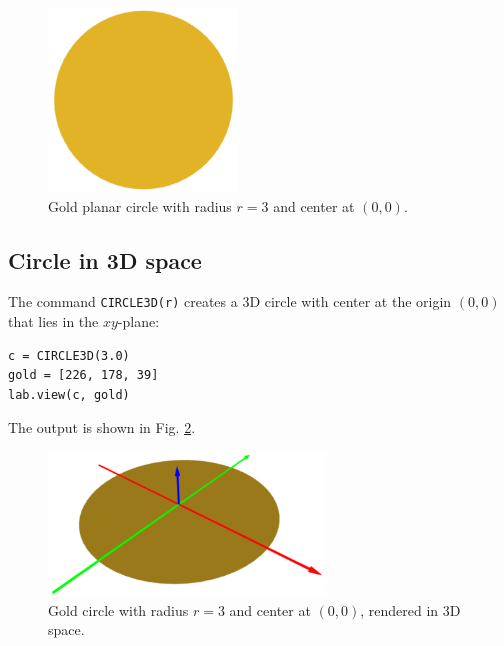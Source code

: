 \begin{figure}[!ht]
\begin{center}
\includegraphics[width=0.45\textwidth]{img/circle-1.png}
\end{center}
\vspace{-4mm}
\caption{Gold planar circle with radius $r = 3$ and center at $(0, 0)$.}
\label{fig:circle-1}
\end{figure}
\noindent

\subsection{Circle in 3D space}

The command {\tt CIRCLE3D(r)}
creates a 3D circle with center at the origin $(0, 0)$ that lies 
in the $xy$-plane:\\

\begin{bbox}
\begin{verbatim}
c = CIRCLE3D(3.0)
gold = [226, 178, 39]
lab.view(c, gold)
\end{verbatim}
\end{bbox}
\vspace{6mm}

\noindent
The output is shown in Fig. \ref{fig:circle-2}.
\newpage

\begin{figure}[!ht]
\begin{center}
\includegraphics[width=0.65\textwidth]{img/circle-2.png}
\end{center}
\vspace{-4mm}
\caption{Gold circle with radius $r = 3$ and center at $(0, 0)$, rendered in 3D space.}
\label{fig:circle-2}
\end{figure}
\noindent


